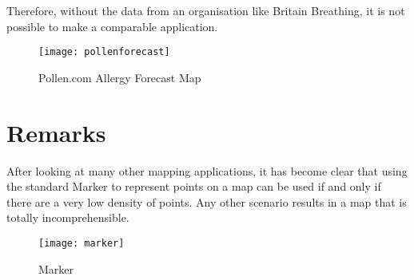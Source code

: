 Therefore, without the data from an organisation like Britain Breathing, it is not possible to make a comparable application.

\begin{figure}[H]
\begin{center}
\texttt{[image: pollenforecast]}
\caption{Pollen.com Allergy Forecast Map}
\end{center}
\end{figure}

\section{Remarks}

After looking at many other mapping applications, it has become clear that using the standard Marker to represent points on a map can be used if and only if there are a very low density of points. Any other scenario results in a map that is totally incomprehensible.

\begin{figure}[H]
\centering
\texttt{[image: marker]}
\caption{Marker}\label{fig:marker}
\end{figure}